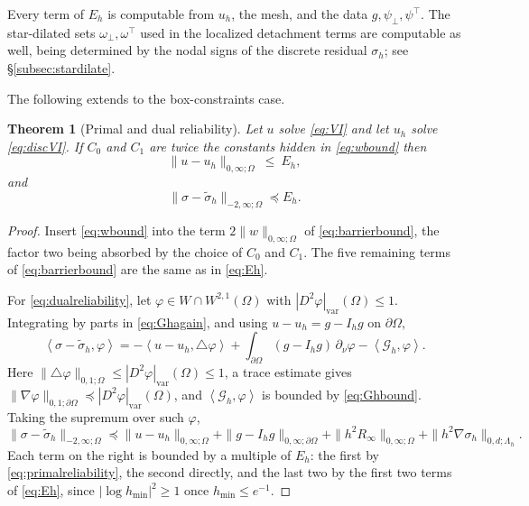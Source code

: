 \documentclass[12pt]{amsart}
\numberwithin{equation}{section}
\theoremstyle{plain}
\newtheorem{theorem}{Theorem}[section]  %
\theoremstyle{definition}
\theoremstyle{remark}
\newcommand{\Om}{\Omega}
\newcommand{\dOm}{\partial\Omega}
\newcommand{\psilo}{\psi_\bot}
\newcommand{\psiup}{\psi^\top}
\newcommand{\Ih}{I_h}
\newcommand{\Gh}{\mathcal{G}_h}
\newcommand{\Lamh}{\Lambda_h}
\newcommand{\ombot}{\omega_\bot}
\newcommand{\omtop}{\omega^\top}
\begin{document}
Every term of $E_h$ is computable from $u_h$, the mesh, and the data $g,\psilo,\psiup$.  The star-dilated sets $\ombot,\omtop$ used in the localized detachment terms are computable as well, being determined by the nodal signs of the discrete residual $\sigma_h$; see \S \ref{subsec:stardilate}.

The following extends \cite[Theorem 5.4]{NSV03} to the box-constraints case.

\begin{theorem}[Primal and dual reliability]
\label{thm:reliability}
Let $u$ solve \eqref{eq:VI} and let $u_h$ solve \eqref{eq:discVI}.  If $C_0$ and $C_1$ are twice the constants hidden in \eqref{eq:wbound} then
\begin{equation}
\label{eq:primalreliability}
  \|u-u_h\|_{0,\infty;\Om} \ \le\ E_h,
\end{equation}
and
\begin{equation}
\label{eq:dualreliability}
\|\sigma-\tilde\sigma_h\|_{-2,\infty;\Om} \preceq E_h.
\end{equation}
\end{theorem}

\begin{proof}
Insert \eqref{eq:wbound} into the term $2\|w\|_{0,\infty;\Om}$ of \eqref{eq:barrierbound}, the factor two being absorbed by the choice of $C_0$ and $C_1$.  The five remaining terms of \eqref{eq:barrierbound} are the same as in \eqref{eq:Eh}.

For \eqref{eq:dualreliability}, let $\varphi \in W \cap W^{2,1}(\Om)$ with $|D^2\varphi|_{\mathrm{var}}(\Om)\le 1$.  Integrating by parts in \eqref{eq:Ghagain}, and using $u - u_h = g - \Ih g$ on $\dOm$,
\[
  \left<\sigma-\tilde\sigma_h,\varphi\right> = -\left<u-u_h,\triangle\varphi\right> + \int_{\dOm}(g-\Ih g)\,\partial_\nu\varphi - \left<\Gh,\varphi\right>.
\]
Here $\|\triangle\varphi\|_{0,1;\Om} \le |D^2\varphi|_{\mathrm{var}}(\Om) \le 1$, a trace estimate gives $\|\nabla\varphi\|_{0,1;\dOm} \preceq |D^2\varphi|_{\mathrm{var}}(\Om)$, and $\left<\Gh,\varphi\right>$ is bounded by \eqref{eq:Ghbound}.  Taking the supremum over such $\varphi$,
\[
  \|\sigma-\tilde\sigma_h\|_{-2,\infty;\Om} \preceq \|u-u_h\|_{0,\infty;\Om} + \|g-\Ih g\|_{0,\infty;\dOm} + \|h^2R_\infty\|_{0,\infty;\Om} + \|h^2\nabla\sigma_h\|_{0,d;\Lamh}.
\]
Each term on the right is bounded by a multiple of $E_h$: the first by \eqref{eq:primalreliability}, the second directly, and the last two by the first two terms of \eqref{eq:Eh}, since $|\log h_{\min}|^2 \ge 1$ once $h_{\min}\le e^{-1}$.
\end{proof}
\end{document}
